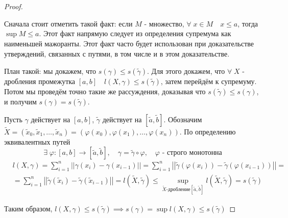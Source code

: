 \documentclass[../main.tex]{subfiles}
\begin{document}
\begin{proof}
    
    ~

    Сначала стоит отметить такой факт: если \( M\) - множество, \( \forall \; x \in M\quad x \leq a\), тогда \( \sup\limits_{ } M \leq a\). Этот факт напрямую следует из определения супремума как наименьшей мажоранты. Этот факт часто будет использован
    при доказательстве утверждений, связанных с путями, в том числе и в этом доказательстве. 
    
    План такой: мы докажем, что \( s\left( \gamma \right) \leq s\left( \tilde{ \gamma }\right)\). 
    Для этого докажем, что \( \forall \; X\) - дробления промежутка \( \left[ a,b\right]\quad l \left( X, \gamma \right) \leq s\left( \tilde{ \gamma }\right)\), затем перейдём к супремуму. Потом мы проведём точно такие же рассуждения, доказывая что \( s\left( \tilde{ \gamma }\right) \leq s\left( \gamma \right)\), и получим \( s\left( \gamma \right)=s\left( \tilde{ \gamma }\right)\).

    Пусть \( \gamma \) действует на \( \left[ a,b\right]\), \( \tilde{ \gamma }\) действует на \( [ \tilde{ a}, \tilde{ b}]\). Обозначим \\\( \tilde{ X}=( \tilde{ x}_0, \tilde{ x}_1, \dots, \tilde{ x}_n)=( \varphi \left( x_0\right), \varphi \left( x_1\right), \dots, \varphi \left( x_n\right))\). По определению эквивалентных путей 
    \[ \exists \; \varphi : \left[ a,b\right] \longrightarrow [ \tilde{ a}, \tilde{ b}],\quad \gamma = \tilde{ \gamma }\circ \varphi ,\quad \varphi \text{ - строго монотонна}\]
    \begin{equation*}
        \begin{aligned}
            &l \left( X, \gamma \right)= \sum\limits_{ i=1}^{ n} \left| \left| \gamma \left( x_i\right)- \gamma \left( x_{i-1}\right)\right|\right|= \sum\limits_{ i=1}^{ n} \left| \left| \tilde\gamma \left( \varphi \left( x_i\right)\right)- \tilde{ \gamma }\left( \varphi \left( x_{i-1}\right)\right)\right|\right|=\\ 
            &= \sum\limits_{ i=1}^{ n} \left| \left| \tilde{ \gamma }\left( \tilde{ x}_i\right)- \tilde{ \gamma }\left( \tilde{ x}_{i-1}\right)\right|\right|=l ( \tilde{ X}, \tilde{ \gamma }) \leq \sup\limits_{ \tilde{ X}\text{-дробление}[ \tilde{ a}, \tilde{ b}]} l ( \tilde{ X}, \tilde{ \gamma })=s\left( \tilde{ \gamma }\right)
        \end{aligned}
    \end{equation*}

    Таким образом, \( l \left( X, \gamma \right) \leq s\left( \tilde{ \gamma }\right) \implies s\left( \gamma \right)= \sup\limits_{ } l \left( X, \gamma \right) \leq s\left( \tilde{ \gamma }\right)\) 


\end{proof}
\end{document}
